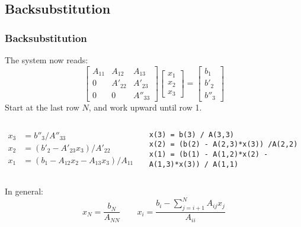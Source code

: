 \subsection*{Backsubstitution}
\begin{frame}[fragile]
  \frametitle{Backsubstitution}
  The system now reads:
  \[
    \begin{bmatrix}
      A_{11} & A_{12} & A_{13}\\ 
      0      & A'_{22} & A'_{23}\\ 
      0 & 0 & A''_{33}
    \end{bmatrix}
    \begin{bmatrix}x_1\\x_2\\x_3\end{bmatrix} = 
    \begin{bmatrix}b_1\\b'_2\\b''_3\end{bmatrix}
  \]
  \pause
  Start at the last row $N$, and work upward until row 1.
  \begin{columns}
    \begin{align*}
     x_3 &= b''_3/A''_{33}\\
     x_2 &= (b'_2 - A'_{23}x_3)/A'_{22}\\
     x_1 &= (b_1 - A_{12}x_2 - A_{13}x_3)/A_{11}
    \end{align*}
    \pause
\begin{lstlisting}
x(3) = b(3) / A(3,3)
x(2) = (b(2) - A(2,3)*x(3)) /A(2,2)
x(1) = (b(1) - A(1,2)*x(2) - A(1,3)*x(3)) / A(1,1)
\end{lstlisting}
\end{columns}
In general:
\[
 x_N = \frac{b_N}{A_{NN}} \qquad x_i = \frac{b_i - \sum_{j=i+1}^{N}A_{ij}x_j}{A_{ii}}
\]
\end{frame}

